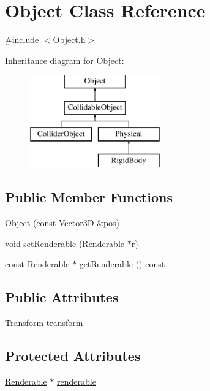 \hypertarget{class_object}{\section{Object Class Reference}
\label{class_object}
}


{\ttfamily \#include $<$Object.\-h$>$}

Inheritance diagram for Object\-:\begin{figure}[H]
\begin{center}
\leavevmode
\includegraphics[height=4.000000cm]{class_object}
\end{center}
\end{figure}
\subsection*{Public Member Functions}
\begin{DoxyCompactItemize}
\item 
\hyperlink{class_object_af927ea9f0f93cd28814b76b41679246c}{Object} (const \hyperlink{class_vector3_d}{Vector3\-D} \&pos)
\item 
void \hyperlink{class_object_aad059ec469e812c147454f275709e88f}{set\-Renderable} (\hyperlink{class_renderable}{Renderable} $\ast$r)
\item 
const \hyperlink{class_renderable}{Renderable} $\ast$ \hyperlink{class_object_aed3cdc94cd166ca82b97da3e56aca49d}{get\-Renderable} () const 
\end{DoxyCompactItemize}
\subsection*{Public Attributes}
\begin{DoxyCompactItemize}
\item 
\hyperlink{class_transform}{Transform} \hyperlink{class_object_ad2104d9214add76b33191f1993faa3ae}{transform}
\end{DoxyCompactItemize}
\subsection*{Protected Attributes}
\begin{DoxyCompactItemize}
\item 
\hyperlink{class_renderable}{Renderable} $\ast$ \hyperlink{class_object_aa632828fdce73d2297c6b8841865f14d}{renderable}
\end{DoxyCompactItemize}


